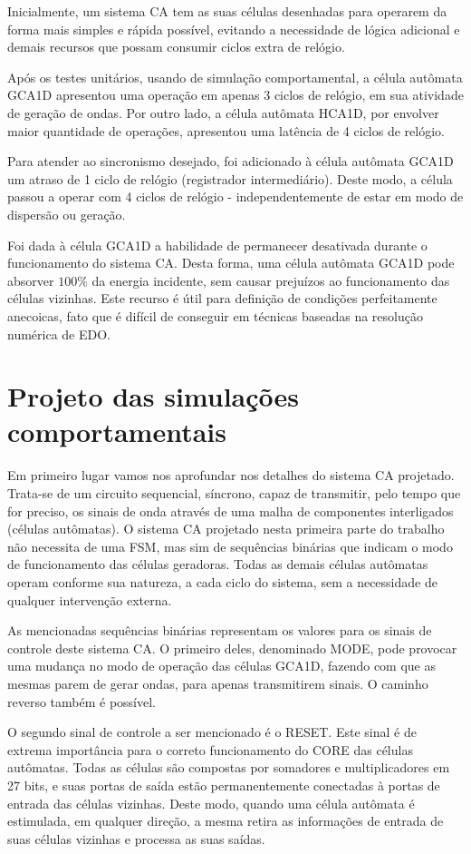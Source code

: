 Inicialmente, um sistema CA tem as suas células desenhadas para operarem da forma mais simples e rápida possível, evitando a necessidade de lógica adicional e demais recursos que possam consumir ciclos extra de relógio.

Após os testes unitários, usando de simulação comportamental, a célula autômata GCA1D apresentou uma operação em apenas 3 ciclos de relógio, em sua atividade de geração de ondas. Por outro lado, a célula autômata HCA1D, por envolver maior quantidade de operações, apresentou uma latência de 4 ciclos de relógio.

Para atender ao sincronismo desejado, foi adicionado à célula autômata GCA1D um atraso de 1 ciclo de relógio (registrador intermediário). Deste modo, a célula passou a operar com 4 ciclos de relógio - independentemente de estar em modo de dispersão ou geração. 

Foi dada à célula GCA1D a habilidade de permanecer desativada durante o funcionamento do sistema CA. Desta forma, uma célula autômata GCA1D pode absorver $100\%$ da energia incidente, sem causar prejuízos ao funcionamento das células vizinhas. Este recurso é útil para definição de condições perfeitamente anecoicas, fato que é difícil de conseguir em técnicas baseadas na resolução numérica de EDO.

\section{Projeto das simulações comportamentais}

Em primeiro lugar vamos nos aprofundar nos detalhes do sistema CA projetado. Trata-se de um circuito sequencial, síncrono, capaz de transmitir, pelo tempo que for preciso, os sinais de onda através de uma malha de componentes interligados (células autômatas). O sistema CA projetado nesta primeira parte do trabalho não necessita de uma FSM, mas sim de sequências binárias que indicam o modo de funcionamento das células geradoras. Todas as demais células autômatas operam conforme sua natureza, a cada ciclo do sistema, sem a necessidade de qualquer intervenção externa.

As mencionadas sequências binárias representam os valores para os sinais de controle deste sistema CA. O primeiro deles, denominado MODE, pode provocar uma mudança no modo de operação das células GCA1D, fazendo com que as mesmas parem de gerar ondas, para apenas transmitirem sinais. O caminho reverso também é possível.

O segundo sinal de controle a ser mencionado é o RESET. Este sinal é de extrema importância para o correto funcionamento do CORE das células autômatas. Todas as células são compostas por somadores e multiplicadores em 27 bits, e suas portas de saída estão permanentemente conectadas à portas de entrada das células vizinhas. Deste modo, quando uma célula autômata é estimulada, em qualquer direção, a mesma retira as informações de entrada de suas células vizinhas e processa as suas saídas.

